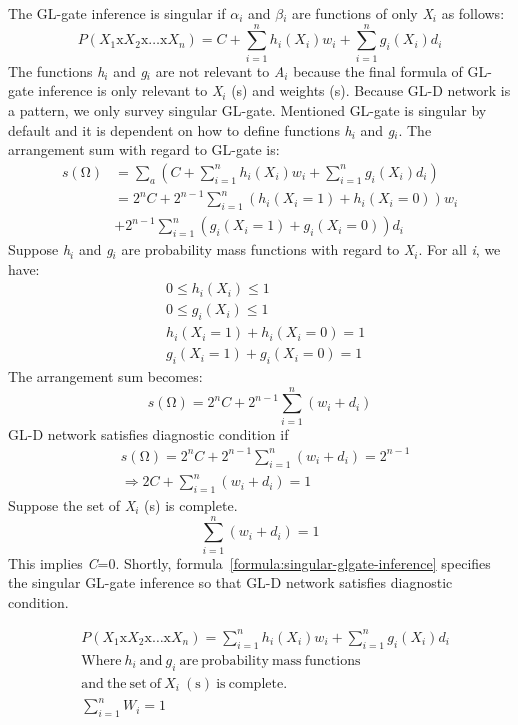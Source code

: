 \documentclass{article}
\numberwithin{equation}{section}
\numberwithin{figure}{section}
\numberwithin{table}{section}
\begin{document}
The GL-gate inference is singular if \textit{$\alpha$${}_{i}$} and \textit{$\beta$${}_{i}$} are functions of only \textit{X${}_{i}$} as follows:
\[P\left(X_1\mathrm{x}X_2\mathrm{x}\dots \mathrm{x}X_n\right)=C+\sum^n_{i=1}{h_i\left(X_i\right)w_i}+\sum^n_{i=1}{g_i\left(X_i\right)d_i}\] 
The functions \textit{h${}_{i}$} and \textit{g${}_{i}$} are not relevant to \textit{A${}_{i}$} because the final formula of GL-gate inference is only relevant to \textit{X${}_{i}$} (s) and weights (s). Because GL-D network is a pattern, we only survey singular GL-gate. Mentioned GL-gate is singular by default and it is dependent on how to define functions \textit{h${}_{i}$} and \textit{g${}_{i}$}. The arrangement sum with regard to GL-gate is:
\begin{align*}
s\left(\mathrm{\Omega }\right)&=\sum_a{\left(C+\sum^n_{i=1}{h_i\left(X_i\right)w_i}+\sum^n_{i=1}{g_i\left(X_i\right)d_i}\right)}\\
&=2^nC+2^{n-1}\sum^n_{i=1}{\left(h_i\left(X_i=1\right)+h_i\left(X_i=0\right)\right)w_i}\\
&+2^{n-1}\sum^n_{i=1}{\left(g_i\left(X_i=1\right)+g_i\left(X_i=0\right)\right)d_i}
\end{align*}
Suppose \textit{h${}_{i}$} and \textit{g${}_{i}$} are probability mass functions with regard to \textit{X${}_{i}$}. For all \textit{i}, we have:
\begin{align*}
&0\le h_i\left(X_i\right)\le 1\\
&0\le g_i\left(X_i\right)\le 1\\
&h_i\left(X_i=1\right)+h_i\left(X_i=0\right)=1\\
&g_i\left(X_i=1\right)+g_i\left(X_i=0\right)=1
\end{align*}
The arrangement sum becomes:
\[s\left(\mathrm{\Omega }\right)=2^nC+2^{n-1}\sum^n_{i=1}{\left(w_i+d_i\right)}\] 
GL-D network satisfies diagnostic condition if
\begin{align*}
&s\left(\mathrm{\Omega }\right)=2^nC+2^{n-1}\sum^n_{i=1}{\left(w_i+d_i\right)}=2^{n-1}\\
&\Rightarrow 2C+\sum^n_{i=1}{\left(w_i+d_i\right)}=1
\end{align*}
Suppose the set of \textit{X${}_{i}$} (s) is complete.
\[\sum^n_{i=1}{\left(w_i+d_i\right)}=1\] 
This implies \textit{C}=0. Shortly, formula~\ref{formula:singular-glgate-inference} specifies the singular GL-gate inference so that GL-D network satisfies diagnostic condition.

\begin{equation}
\begin{split}
&P\left(X_1\mathrm{x}X_2\mathrm{x}\dots \mathrm{x}X_n\right)=\sum^n_{i=1}{h_i\left(X_i\right)w_i}+\sum^n_{i=1}{g_i\left(X_i\right)d_i}\\
&\mathrm{Where}\ h_i\ \mathrm{and}\ g_i\ \mathrm{are}\ \mathrm{probability}\ \mathrm{mass}\ \mathrm{functions}\\
&\mathrm{and}\ \mathrm{the}\ \mathrm{set}\ \mathrm{of}\ X_i\ \mathrm{(s)}\ \mathrm{is}\ \mathrm{complete.}\\
&\sum^n_{i=1}{W_i}=1
\end{split}
\label{formula:singular-glgate-inference}
\end{equation} 
\end{document}
